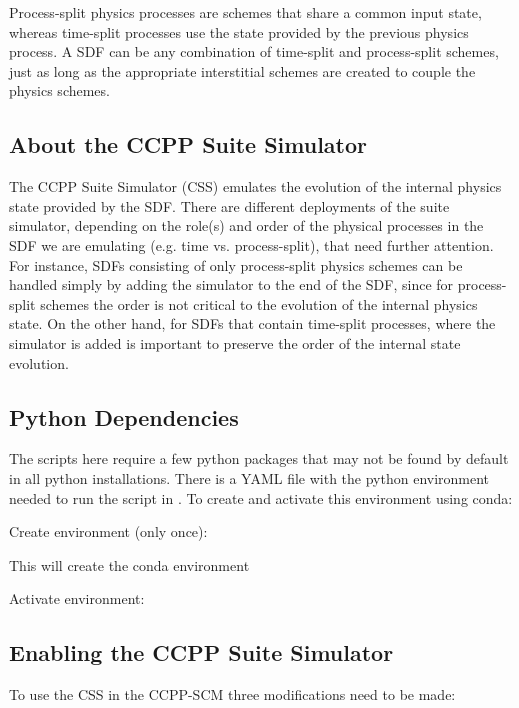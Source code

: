 Process-split physics processes are schemes that share a common input state, whereas time-split processes use the state provided by the previous physics process. A SDF can be any combination of time-split and process-split schemes, just as long as the appropriate interstitial schemes are created to couple the physics schemes.

\subsection{About the CCPP Suite Simulator}

The CCPP Suite Simulator (CSS) emulates the evolution of the internal physics state provided by the SDF. There are different deployments of the suite simulator, depending on the role(s) and order of the physical processes in the SDF we are emulating (e.g. time vs. process-split), that need further attention. For instance, SDFs consisting of only process-split physics schemes can be handled simply by adding the simulator to the end of the SDF, since for process-split schemes the order is not critical to the evolution of the internal physics state. On the other hand, for SDFs that contain time-split processes, where the simulator is added is important to preserve the order of the internal state evolution.

\subsection{Python Dependencies}
\label{subsection: pydepend}
The scripts here require a few python packages that may not be found by default in all python installations. There is a YAML file with the python environment needed to run the script in . To create and activate this environment using conda:

Create environment (only once):


This will create the conda environment 


Activate environment:


\subsection{Enabling the CCPP Suite Simulator}

To use the CSS in the CCPP-SCM three modifications need to be made:

